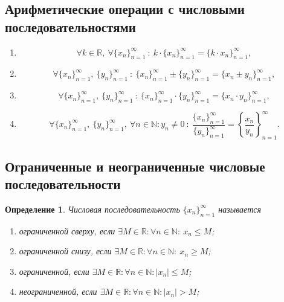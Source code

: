 \documentclass[a4paper,12pt]{article} %
\newtheorem{definition}{Определение}[section]
\theoremstyle{remark}
\theoremstyle{definition}
\begin{document}
\subsection{Арифметические операции с числовыми последовательностями}
\begin{enumerate}
    \item \[\forall k\in \mathbb{R}, \ \forall \{x_n\}_{n=1}^{\infty} \ : \ k\cdot \{x_n\}_{n=1}^{\infty} =
    \{k\cdot x_n\}_{n=1}^{\infty},\] 
    \item \[\forall \{x_n\}_{n=1}^{\infty}, \ \{y_n\}_{n=1}^{\infty} \ : \ \{x_n\}_{n=1}^{\infty} \pm \{y_n\}_{n=1}^{\infty}
    = \{x_n \pm y_n\}_{n=1}^{\infty},\] 
    \item \[\forall \{x_n\}_{n=1}^{\infty}, \ \{y_n\}_{n=1}^{\infty} \ : \ \{x_n\}_{n=1}^{\infty} \cdot \{y_n\}_{n=1}^{\infty}
    = \{x_n \cdot y_n\}_{n=1}^{\infty},\] 
    \item \[\forall \{x_n\}_{n=1}^{\infty}, \ \{y_n\}_{n=1}^{\infty}, \ \forall n \in \mathbb{N} : y_n \neq 0 \ : \
        \frac{\{x_n\}_{n=1}^{\infty}}{\{y_n\}_{n=1}^{\infty}} = \left\{\frac{x_n}{y_n}\right\}_{n=1}^{\infty}.\]
\end{enumerate}

\subsection{Ограниченные и неограниченные числовые последовательности}

\begin{definition}
	Числовая последовательность $\{x_n\}_{n=1}^\infty$ называется 

	\begin{enumerate}
		\item ограниченной сверху, если $\exists M\in \mathbb{R}: \forall n\in \mathbb{N}: \ x_n\le M$;
		\item ограниченной снизу, если \space $\exists M\in \mathbb{R}: \forall n\in \mathbb{N}: \ x_n\ge M$;
		\item ограниченной, если \space\space\space\space\space\space\space\space\space $\exists M\in \mathbb{R}: \forall n\in \mathbb{N}:|x_n| \le M$;
		\item неограниченной, если \space\space\space\space\space\space $\exists M\in \mathbb{R}: \forall n\in \mathbb{N}:|x_n|> M$;
	\end{enumerate}
\end{definition}
\end{document}

